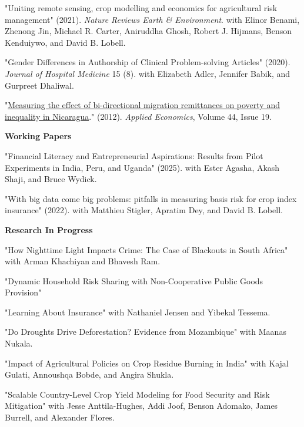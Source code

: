 \documentclass[11pt,letterpaper]{article}
\newcommand{\horse}{5pt} 	%
\newcommand{\littlehorse}{5pt}%
\newenvironment{itemize*}%
  {\begin{itemize}[topsep=0pt, partopsep=0pt, leftmargin=1.6em, itemindent=-1.6em, labelsep=0pt, labelwidth=0pt]%
    \setlength{\itemsep}{\littlehorse}%
    \setlength{\parskip}{0pt}%
    \interlinepenalty=10000}%
  {\end{itemize}\vspace{\horse}}
\newcommand{\resheading}[1]{%
  \vspace{6pt}%
  {\textbf{\large #1}}%
  \par\vspace{4pt}}
\begin{document}
\begin{itemize*}
  \item[]{"Uniting remote sensing, crop modelling and economics for agricultural risk management" (2021).  \textit{Nature Reviews Earth \& Environment}. with Elinor Benami, Zhenong Jin, Michael R. Carter, Aniruddha Ghosh, Robert J. Hijmans, Benson Kenduiywo, and David B. Lobell.}

  \item[]{"Gender Differences in Authorship of Clinical Problem-solving Articles" (2020).  \textit{Journal of Hospital Medicine} 15 (8). with Elizabeth Adler, Jennifer Babik, and Gurpreet Dhaliwal.}

  \item[]{"\href{http://www.tandfonline.com/doi/abs/10.1080/00036846.2011.564153#.Uqi8GmQW1eM}{Measuring the effect of bi-directional migration remittances on poverty and inequality in Nicaragua}."  (2012). \textit{Applied Economics}, Volume 44, Issue 19.}

\end{itemize*}

\resheading{Working Papers}
\begin{itemize*}

  \item[]{"Financial Literacy and Entrepreneurial Aspirations: Results from Pilot Experiments in India, Peru, and Uganda" (2025). with Ester Agasha, Akash Shaji, and Bruce Wydick.}

  \item[]{"With big data come big problems: pitfalls in measuring basis risk for crop index insurance" (2022). with Matthieu Stigler, Apratim Dey, and David B. Lobell.}

\end{itemize*}

\resheading{Research In Progress}
\begin{itemize*}

\item[]{"How Nighttime Light Impacts Crime: The Case of Blackouts in South Africa" with Arman Khachiyan and Bhavesh Ram.}

\item[]{"Dynamic Household Risk Sharing with Non-Cooperative Public Goods Provision"}

\item[]{"Learning About Insurance" with Nathaniel Jensen and Yibekal Tessema.}

\item[]{"Do Droughts Drive Deforestation? Evidence from Mozambique" with Maanas Nukala.}

\item[]{"Impact of Agricultural Policies on Crop Residue Burning in India" with Kajal Gulati, Annoushqa Bobde, and Angira Shukla.}

\item[]{"Scalable Country-Level Crop Yield Modeling for Food Security and Risk Mitigation" with Jesse Anttila-Hughes, Addi Joof, Benson Adomako, James Burrell, and Alexander Flores.}

\end{itemize*}
\end{document}
